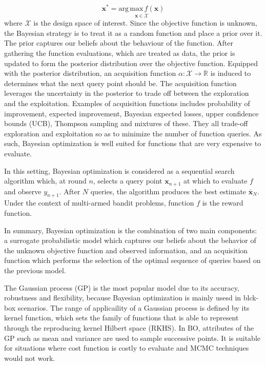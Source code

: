 \documentclass{article}
\begin{document}
\begin{equation}
  \mathbf{x}^* = \underset{\mathbf{x} \in \mathcal{X}}{\mathrm{arg \,
      max} \, f(\mathbf{x})}
\end{equation}
where $\mathcal{X}$ is the design space of interest. Since the objective function is unknown, the Bayesian
strategy is to treat it as a random function and place a prior over it. The prior captures our beliefs about the behaviour of the
function. After gathering the function evaluations, which are treated
as data, the prior is updated to form the posterior distribution
over the objective function. Equipped with the posterior distribution,
an acquisition function $\alpha: \mathcal{X} \rightarrow \mathbb{R}$
is induced to determines what the
next query point should be. The acquisition function leverages the
uncertainty in the posterior to trade off between the exploration and
the exploitation. Examples of acquisition functions includes
probability of improvement, expected improvement, Bayesian expected
losses, upper confidence bounds (UCB), Thompson sampling and mixtures
of these. They all trade-off exploration and exploitation so as to
minimize the number of function queries. As such, Bayesian
optimization is well suited for functions that are very expensive to evaluate.

In this setting, Bayesian optimization is considered as a sequential
search algorithm which, at round $n$, selects a query point
$\mathbf{x}_{n+1}$ at which to evaluate $f$ and observe
$y_{n+1}$. After $N$ queries, the algorithm produces the best estimate
$\bar{\mathbf{x}}_N$. Under the context of multi-armed bandit
problems, function $f$ is the reward function.
  
In summary, Bayesian optimization is the combination of two main
components: a surrogate probabilistic model which captures our beliefs
about the behavior of the unknown objective function and observed
information, and an acquisition function which performs the selection
of the optimal sequence of queries based on the previous model.

The Gaussian process (GP) is the most popular model due to
its accuracy, robustness and flexibility, because Bayesian
optimization is mainly usesd in blck-box scenarios. The range of
applicaility of a Gaussian process is defined by its kernel function,
which sets the family of functions that is able to represent through
the reproducing kernel Hilbert space (RKHS). In BO, attributes of the
GP such as mean and variance are used to sample successive points. It
is suitable for situations where cost function is costly to evaluate
and MCMC techniques would not work.
\end{document}
